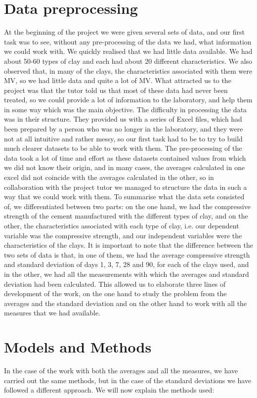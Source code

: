 \documentclass[10pt,conference,compsocconf]{IEEEtran}
\begin{document}
\section{Data preprocessing }
At the beginning of the project we were given several sets of data, and our first task was to see, without any pre-processing of the data we had, what information we could work with. We quickly realised that we had little data available. We had about 50-60 types of clay and each had about 20 different characteristics. We also observed that, in many of the clays, the characteristics associated with them were MV, so we had little data and quite a lot of MV.
What attracted us to the project was that the tutor told us that most of these data had never been treated, so we could provide a lot of information to the laboratory, and help them in some way which was the main objective.
The difficulty in processing the data was in their structure. They provided us with a series of Excel files, which had been prepared by a person who was no longer in the laboratory, and they were not at all intuitive and rather messy, so our first task had to be to try to build much clearer datasets to be able to work with them.
The pre-processing of the data took a lot of time and effort as these datasets contained values from which we did not know their origin, and in many cases, the averages calculated in one excel did not coincide with the averages calculated in the other, so in collaboration with the project tutor we managed to structure the data in such a way that we could work with them.
 To summarise what the data sets consisted of, we differentiated between two parts: on the one hand, we had the compressive strength of the cement manufactured with the different types of clay, and on the other, the characteristics associated with each type of clay, i.e. our dependent variable was the compressive strength, and our independent variables were the characteristics of the clays. It is important to note that the difference between the two sets of data is that, in one of them, we had the average compressive strength and standard deviation of days 1, 3, 7, 28 and 90, for each of the clays used, and in the other, we had all the measurements with which the averages and standard deviation had been calculated. 
This allowed us to elaborate three lines of development of the work, on the one hand to study the problem from the averages and the standard deviation and on the other hand to work with all the measures that we had available.
\section{Models and Methods}
In the case of the work with both the averages and all the measures, we have carried out the same methods, but in the case of the standard deviations we have followed a different approach. We will now explain the methods used:
\end{document}

